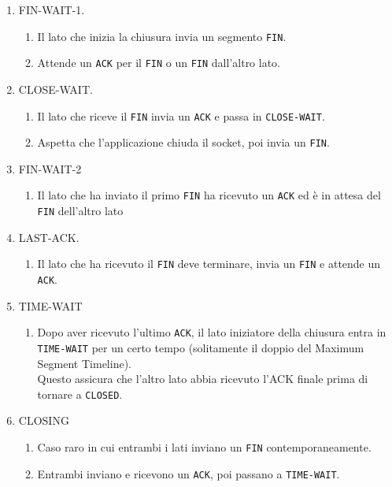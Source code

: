 \begin{enumerate}
	\subsection{Fasi della chiusura della connessione (4-way-handshake)}
	\item FIN-WAIT-1.
	\begin{enumerate}
		\item Il lato che inizia la chiusura invia un segmento \verb|FIN|.
		\item Attende un \verb|ACK| per il \verb|FIN| o un \verb|FIN| dall'altro lato.
	\end{enumerate}
	\item CLOSE-WAIT.
	\begin{enumerate}
		\item Il lato che riceve il \verb|FIN| invia un \verb|ACK| e passa in \verb|CLOSE-WAIT|.
		\item Aspetta che l'applicazione chiuda il socket, poi invia un \verb|FIN|.
	\end{enumerate}
	\item FIN-WAIT-2
	\begin{enumerate}
		\item Il lato che ha inviato il primo \verb|FIN| ha ricevuto un \verb|ACK| ed è in attesa del \verb|FIN| dell'altro lato
	\end{enumerate}
	
	\item LAST-ACK.
	\begin{enumerate}
		\item Il lato che ha ricevuto il \verb|FIN| deve terminare, invia un \verb|FIN| e attende un \verb|ACK|.
	\end{enumerate}
	
	\item TIME-WAIT
	\begin{enumerate}
		\item Dopo aver ricevuto l'ultimo \verb|ACK|, il lato iniziatore della chiusura entra in \verb|TIME-WAIT| per un certo tempo (solitamente il doppio del Maximum Segment Timeline).\\
		Questo assicura che l'altro lato abbia ricevuto l'ACK finale prima di tornare a \verb|CLOSED|.
	\end{enumerate}
	
	\item CLOSING
	\begin{enumerate}
		\item Caso raro in cui entrambi i lati inviano un \verb|FIN| contemporaneamente.
		\item Entrambi inviano e ricevono un \verb|ACK|, poi passano a \verb|TIME-WAIT|.
	\end{enumerate}
\end{enumerate}
\newpage

